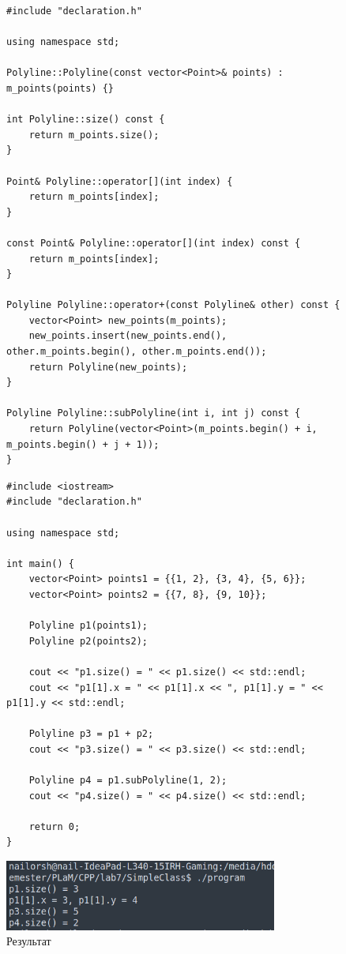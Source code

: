 \documentclass[a4paper, 14pt]{extarticle}
\begin{document}
\begin{figure}[!htb]
\begin{lstlisting}[language={},caption={Определения методов класса},label={lst:implementation}]
#include "declaration.h"

using namespace std;

Polyline::Polyline(const vector<Point>& points) : m_points(points) {}

int Polyline::size() const {
    return m_points.size();
}

Point& Polyline::operator[](int index) {
    return m_points[index];
}

const Point& Polyline::operator[](int index) const {
    return m_points[index];
}

Polyline Polyline::operator+(const Polyline& other) const {
    vector<Point> new_points(m_points);
    new_points.insert(new_points.end(), other.m_points.begin(), other.m_points.end());
    return Polyline(new_points);
}

Polyline Polyline::subPolyline(int i, int j) const {
    return Polyline(vector<Point>(m_points.begin() + i, m_points.begin() + j + 1));
}
\end{lstlisting}
\end{figure}

\begin{figure}[!htb]
\begin{lstlisting}[language={},caption={Проверка работоспособности},label={lst:main}]
#include <iostream>
#include "declaration.h"

using namespace std;

int main() {
    vector<Point> points1 = {{1, 2}, {3, 4}, {5, 6}};
    vector<Point> points2 = {{7, 8}, {9, 10}};
    
    Polyline p1(points1);
    Polyline p2(points2);
    
    cout << "p1.size() = " << p1.size() << std::endl;
    cout << "p1[1].x = " << p1[1].x << ", p1[1].y = " << p1[1].y << std::endl;
    
    Polyline p3 = p1 + p2;
    cout << "p3.size() = " << p3.size() << std::endl;
    
    Polyline p4 = p1.subPolyline(1, 2);
    cout << "p4.size() = " << p4.size() << std::endl;
    
    return 0;
}
\end{lstlisting}
\end{figure}


\begin{figure}[!htb]
	\centering
	\includegraphics[width=0.8\textwidth]{output.png}
\caption{Результат}
\label{fig:output}
\end{figure}
\end{document}
